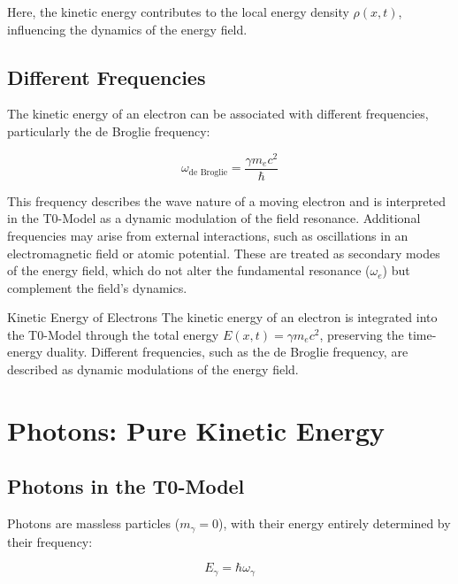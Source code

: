 \documentclass[12pt,a4paper]{article}
\begin{document}
	Here, the kinetic energy contributes to the local energy density \(\rho(x,t)\), influencing the dynamics of the energy field.
	
	\subsection{Different Frequencies}
	\label{subsec:electron_frequencies}
	
	The kinetic energy of an electron can be associated with different frequencies, particularly the de Broglie frequency:
	
	\begin{equation}
		\omega_{\text{de Broglie}} = \frac{\gamma m_e c^2}{\hbar}
	\end{equation}
	
	This frequency describes the wave nature of a moving electron and is interpreted in the T0-Model as a dynamic modulation of the field resonance. Additional frequencies may arise from external interactions, such as oscillations in an electromagnetic field or atomic potential. These are treated as secondary modes of the energy field, which do not alter the fundamental resonance (\(\omega_e\)) but complement the field's dynamics.
	
	\begin{important}{Kinetic Energy of Electrons}{}
		The kinetic energy of an electron is integrated into the T0-Model through the total energy \( E(x,t) = \gamma m_e c^2 \), preserving the time-energy duality. Different frequencies, such as the de Broglie frequency, are described as dynamic modulations of the energy field.
	\end{important}
	
	\section{Photons: Pure Kinetic Energy}
	\label{sec:photon_energy}
	
	\subsection{Photons in the T0-Model}
	\label{subsec:photon_model}
	
	Photons are massless particles (\( m_\gamma = 0 \)), with their energy entirely determined by their frequency:
	
	\begin{equation}
		E_\gamma = \hbar \omega_\gamma
	\end{equation}
	
\end{document}
